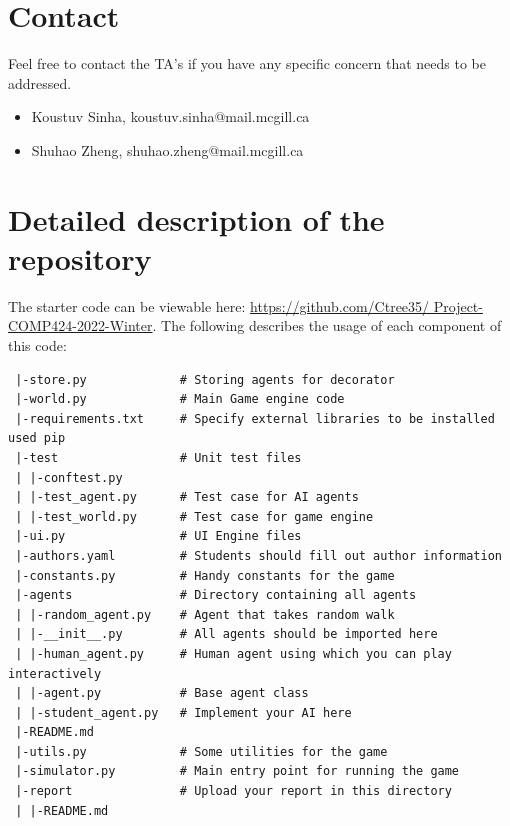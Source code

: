 \documentclass[twoside,11pt]{article}
\begin{document}
\section{Contact}

Feel free to contact the TA's if you have any specific concern that needs to be addressed.

\begin{itemize}
    \item Koustuv Sinha, koustuv.sinha@mail.mcgill.ca
    \item Shuhao Zheng, shuhao.zheng@mail.mcgill.ca 
\end{itemize}

\section{Detailed description of the repository}
\label{sec:repository}

The starter code can be viewable here: \href{https://github.com/Ctree35/Project-COMP424-2022-Winter}{https://github.com/Ctree35/ Project-COMP424-2022-Winter}. The following describes the usage of each component of this code:

\begin{verbatim}
 |-store.py             # Storing agents for decorator
 |-world.py             # Main Game engine code
 |-requirements.txt     # Specify external libraries to be installed used pip
 |-test                 # Unit test files
 | |-conftest.py
 | |-test_agent.py      # Test case for AI agents
 | |-test_world.py      # Test case for game engine
 |-ui.py                # UI Engine files
 |-authors.yaml         # Students should fill out author information
 |-constants.py         # Handy constants for the game
 |-agents               # Directory containing all agents
 | |-random_agent.py    # Agent that takes random walk
 | |-__init__.py        # All agents should be imported here
 | |-human_agent.py     # Human agent using which you can play interactively
 | |-agent.py           # Base agent class
 | |-student_agent.py   # Implement your AI here
 |-README.md
 |-utils.py             # Some utilities for the game
 |-simulator.py         # Main entry point for running the game
 |-report               # Upload your report in this directory
 | |-README.md
\end{verbatim}





% 
\end{document}
